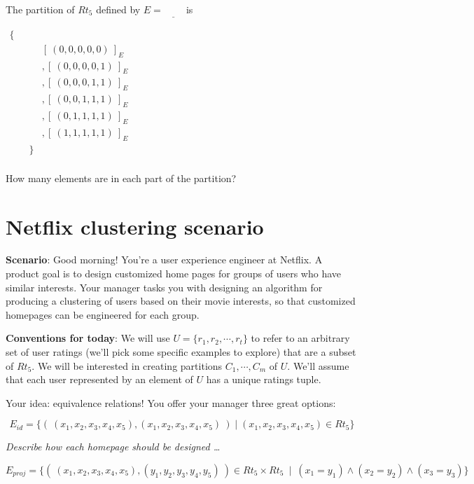 \documentclass[12pt, oneside]{article}
\begin{document}
The partition of $Rt_5$ defined by $E = \underline{\phantom{E_{circ}}}$ is

\begin{math}
\begin{aligned}
    \{ ~~  & \\
    &[ ~(0,0,0,0,0)~ ]_E   \\
    &, [ ~(0,0,0,0,1)~ ]_E \\
    &, [ ~(0,0,0,1,1)~ ]_E \\
    &, [ ~(0,0,1,1,1)~ ]_E \\
    &, [ ~(0,1,1,1,1)~ ]_E \\
    &, [ ~(1,1,1,1,1)~ ]_E \\
    \qquad\}  & \\
\end{aligned}
\end{math}

How many elements are in each part of the partition? \vfill
\section*{Netflix clustering scenario}


{\bf Scenario}: Good morning! You're a user experience engineer at Netflix. A
product goal is to design customized home pages for groups of users who have
similar interests. Your manager tasks you with designing an algorithm for
producing a clustering of users based on their movie interests,
so that customized homepages can be engineered for each group.

{\bf Conventions for today}: 
We will use $U = \{r_1, r_2, \cdots, r_t\}$ to 
refer to an arbitrary set of user ratings (we'll pick some 
specific examples to explore) that are a subset of $Rt_5$. 
We will be interested in creating partitions $C_1, \cdots, C_m$ of 
$U$. We'll assume that each user represented by an element of $U$ 
has a unique ratings tuple.


Your idea: equivalence relations! You offer your manager three great options: 

\[
    E_{id} = \{ ( ~(x_1, x_2, x_3, x_4, x_5), (x_1, x_2, x_3, x_4, x_5)~) \mid 
    (x_1, x_2, x_3, x_4, x_5) \in Rt_5  \}
\]

{\it Describe how each homepage should be designed \ldots }

\vspace{100pt}



\[
    E_{proj} =  \{ ( ~(x_1, x_2, x_3, x_4, x_5), (y_1, y_2, y_3, y_4, y_5)~) \in
         Rt_5 \times Rt_5 ~\mid~(x_1 = y_1) \land  (x_2 = y_2) \land (x_3 = y_3) \}
\]
\end{document}
